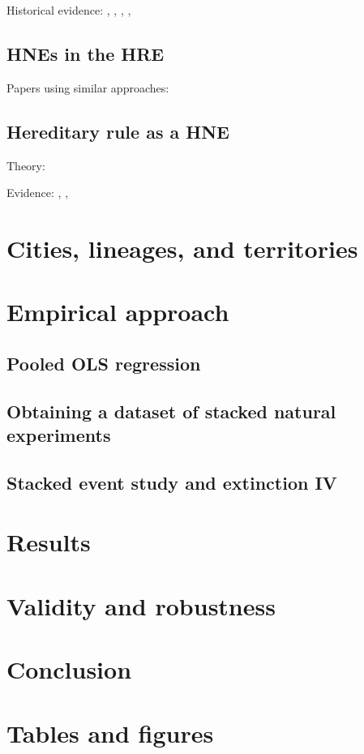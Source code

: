 \documentclass{article}
\begin{document}
Historical evidence: \cite{chilosi2013}, \cite{kindleberger1975}, \cite{campos2019}, \cite{wolf2009}, \cite{chen2004}

\subsection{HNEs in the HRE}

Papers using similar approaches: \cite{cantoni2011}

\subsection{Hereditary rule as a HNE}

Theory: \cite{besley2017}

Evidence: \cite{olken2005}, \cite{dube2020}, \cite{ottinger2022}


\section{Cities, lineages, and territories}

\section{Empirical approach}

\subsection{Pooled OLS regression}

\subsection{Obtaining a dataset of stacked natural experiments}

\subsection{Stacked event study and extinction IV}

\section{Results}

\section{Validity and robustness}

\section{Conclusion}



\newpage
\onehalfspacing



\newpage
\section*{Tables and figures}
\end{document}
